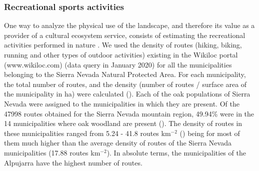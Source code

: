 \subsubsection{Recreational sports activities}\label{sec:es:cultural-sports}
One way to analyze the physical use of the landscape, and therefore its value as a provider of a cultural ecosystem service, consists of estimating the recreational activities performed in nature \autocites[\emph{e.g.}][]{RocesDiazetal2018AssessingDistribution}. We used the density of routes (hiking, biking, running and other types of outdoor activities) existing in the Wikiloc portal (www.wikiloc.com) (data query in January 2020) for all the municipalities belonging to the Sierra Nevada Natural Protected Area. For each municipality, the total number of routes, and the density (number of routes / surface area of the municipality in ha) were calculated (). Each of the oak populations of Sierra Nevada were assigned to the municipalities in which they are present. Of the 47998 routes obtained for the Sierra Nevada mountain region, 49.94\% were in the 14 municipalities where oak woodland are present (). The density of routes in these municipalities ranged from 5.24 - 41.8 routes km$^{-2}$ () being for most of them much higher than the average density of routes of the Sierra Nevada municipalities (17.88 routes km$^{-2}$). In absolute terms, the municipalities of the Alpujarra have the highest number of routes.

\begin{table}[]
\caption{Wikilock routes density (routes km$^{-2}$), and routes total numbers, for the municipalities of Sierra Nevada where Pyrenean oak woodland are located}
\label{tab:es:wikiloc}
\end{table}

